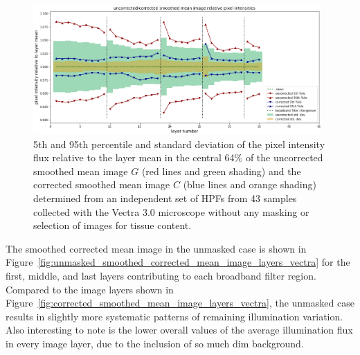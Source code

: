 \documentclass[letterpaper,11pt]{article}
\newcommand{\reffig}[1]{Figure~\ref{#1}}
\begin{document}
\begin{figure}[!ht]
\centering
\includegraphics[width=0.98\textwidth]{images/results/unmasked_flatfield_illumination_variation_reduction_vectra}
\caption{\footnotesize 5th and 95th percentile and standard deviation of the pixel intensity flux relative to the layer mean in the central 64\% of the uncorrected smoothed mean image $G$ (red lines and green shading) and the corrected smoothed mean image $C$ (blue lines and orange shading) determined from an independent set of HPFs from 43 samples collected with the Vectra 3.0 microscope without any masking or selection of images for tissue content.}
\label{fig:unmasked_illumination_variation_reduction_vectra}
\end{figure} 

The smoothed corrected mean image in the unmasked case is shown in \reffig{fig:unmasked_smoothed_corrected_mean_image_layers_vectra} for the first, middle, and last layers contributing to each broadband filter region. Compared to the image layers shown in \reffig{fig:corrected_smoothed_mean_image_layers_vectra}, the unmasked case results in slightly more systematic patterns of remaining illumination variation. Also interesting to note is the lower overall values of the average illumination flux in every image layer, due to the inclusion of so much dim background.
\end{document}
